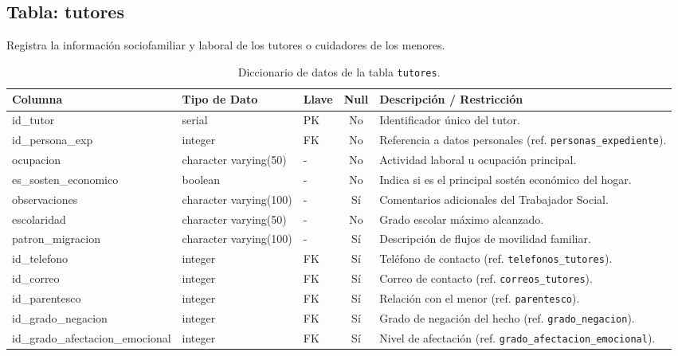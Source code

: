 \subsection{Tabla: tutores}
Registra la información sociofamiliar y laboral de los tutores o cuidadores de los menores.
\begin{table}[htbp!]
\centering
\begin{tabular}{|l|l|l|c|l|}
\hline
\textbf{Columna} & \textbf{Tipo de Dato} & \textbf{Llave} & \textbf{Null} & \textbf{Descripción / Restricción} \\
\hline
id\_tutor & serial & PK & No & Identificador único del tutor. \\
id\_persona\_exp & integer & FK & No & Referencia a datos personales (ref. \texttt{personas\_expediente}). \\
ocupacion & character varying(50) & - & No & Actividad laboral u ocupación principal. \\
es\_sosten\_economico & boolean & - & No & Indica si es el principal sostén económico del hogar. \\
observaciones & character varying(100) & - & Sí & Comentarios adicionales del Trabajador Social. \\
escolaridad & character varying(50) & - & No & Grado escolar máximo alcanzado. \\
patron\_migracion & character varying(100) & - & Sí & Descripción de flujos de movilidad familiar. \\
id\_telefono & integer & FK & Sí & Teléfono de contacto (ref. \texttt{telefonos\_tutores}). \\
id\_correo & integer & FK & Sí & Correo de contacto (ref. \texttt{correos\_tutores}). \\
id\_parentesco & integer & FK & Sí & Relación con el menor (ref. \texttt{parentesco}). \\
id\_grado\_negacion & integer & FK & Sí & Grado de negación del hecho (ref. \texttt{grado\_negacion}). \\
id\_grado\_afectacion\_emocional & integer & FK & Sí & Nivel de afectación (ref. \texttt{grado\_afectacion\_emocional}). \\
\hline
\end{tabular}
\caption{Diccionario de datos de la tabla \texttt{tutores}.}
\label{tbl:diccionarioTutores}
\end{table}

